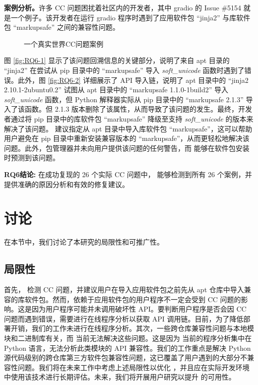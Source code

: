 \textbf{案例分析。}许多 CC 问题困扰着社区内的开发者，其中 gradio 的 Issue \#5154  就是一个例子。该开发者在运行 gradio 程序时遇到了应用软件包 “jinja2” 与库软件包 “markupsafe” 之间的兼容性问题。
\begin{figure}[htbp]
	\centering
	\hspace{4em}
	\caption{一个真实世界CC问题案例}
	\label{fig:RQ6}
\end{figure}
图 \ref{fig:RQ6-1}  显示了该问题回溯信息的关键部分，说明了来自 apt 目录的 “jinja2” 在尝试从 pip 目录中的 “markupsafe” 导入 \textit{soft\_unicode} 函数时遇到了错误。此外，图 \ref{fig:RQ6-2} 详细展示了 API 导入链，说明了 apt 目录中的 “jinja2 2.10.1-2ubuntu0.2” 试图从 apt 目录中的 “markupsafe 1.1.0-1build2” 导入 \textit{soft\_unicode} 函数，但 Python 解释器实际从 pip 目录中的 “markupsafe 2.1.3” 导入了该函数。但 2.1.3 版本删除了该属性，从而导致了该问题的发生。最终，开发者通过将 pip 目录中的库软件包 “markupsafe” 降级至支持 \textit{soft\_unicode} 的版本来解决了该问题。\tool{} 建议指定从 apt 目录中导入库软件包 “markupsafe”，这可以帮助用户避免在 pip 目录中重新安装兼容版本的 “markupsafe”，从而更轻松地解决该问题。此外，包管理器并未向用户提供该问题的任何警告，而 \tool{} 能够在软件包安装时预测到该问题。

\begin{tcolorbox}[boxrule=1pt,boxsep=1pt,left=2pt,right=2pt,top=2pt,bottom=2pt]
	\small
	\textcolor{red}{} \noindent\textbf{RQ6结论:} 
	在成功复现的 26 个实际 CC 问题中，\tool{} 能够检测到所有 26 个案例，并提供准确的原因分析和有效的修复建议。
\end{tcolorbox} 

\section{讨论}
在本节中，我们讨论了本研究的局限性和可推广性。
\subsection{局限性}
首先，\tool{} 检测 CC 问题，并建议用户在导入应用软件包之前先从 apt 仓库中导入兼容的库软件包。然而，依赖于应用软件包的用户程序不一定会受到 CC 问题的影响。这是因为用户程序可能并未调用破坏性 API。要判断用户程序是否会因 CC 问题而遇到错误，需要进行在线程序分析以获取 API 调用链。目前，为了降低部署开销，我们的工作未进行在线程序分析。其次，一些跨仓库兼容性问题与本地模块和二进制库有关，而 \tool{} 当前无法解决这些问题。这是因为 \tool{} 当前的程序分析集中在 Python 语言，无法分析此类模块的 API 兼容性。我们的工作重点是解决 Python 源代码级别的跨仓库第三方软件包兼容性问题，这已覆盖了用户遇到的大部分不兼容性问题。我们将在未来工作中考虑上述局限性以优化 \tool{}，并且应在实际开发环境中使用该技术进行长期评估。未来，我们将开展用户研究以提升 \tool{} 的可用性。
